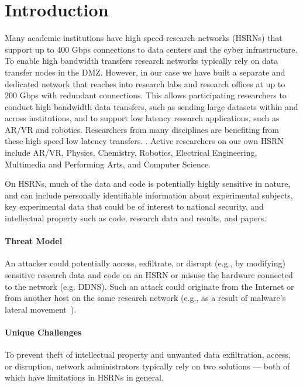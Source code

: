 \begin{center}
{\large \bf \TITLE}
\end{center}

\section{Introduction}

Many academic institutions have high speed research networks (HSRNs) that support up to 400 Gbps connections to data centers and the cyber infrastructure. To enable high bandwidth transfers research networks typically rely on data transfer nodes in the DMZ. However, in our case we have built a separate and dedicated network that reaches into research labs and research offices at up to 200 Gbps with redundant connections. This allows participating researchers to conduct high bandwidth data transfers, such as sending large datasets within and across institutions, and to support  low latency research applications, such as AR/VR and robotics. Researchers from many disciplines are benefiting from these high speed low latency transfers. . Active researchers on our own HSRN include AR/VR, Physics, Chemistry, Robotics, Electrical Engineering, Multimedia and Performing Arts, and Computer Science.

On HSRNs, much of the data and code is potentially highly sensitive in nature, and can include personally identifiable information about experimental subjects, key experimental data that could be of interest to national security, and intellectual property such as code, research data and results, and papers.

\paragraph{Threat Model}
An attacker could potentially access, exfiltrate, or disrupt (e.g., by modifying) sensitive research data and code on an HSRN or misuse the hardware connected to the network (e.g. DDNS). Such an  attack could originate from the Internet or from another host on the same research network (e.g., as a result of malware's lateral movement~\cite{ho2019detecting}).

\paragraph{Unique Challenges}
To prevent theft of intellectual property and unwanted data exfiltration, access, or disruption, network administrators typically rely on two solutions — both of which have limitations in HSRNs in general.

